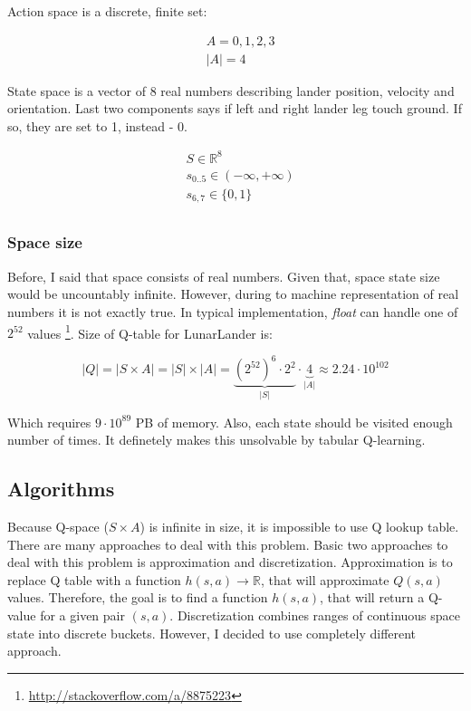\documentclass[12pt]{article}
\begin{document}
Action space is a discrete, finite set:

\begin{equation}
\begin{aligned}
&A = {0,1,2,3} \\
&|A| = 4
\end{aligned}
\end{equation}

State space is a vector of 8 real numbers describing lander position, velocity and orientation. Last two components says if left and right lander leg touch ground. If so, they are set to 1, instead - 0.

\begin{equation}
\begin{aligned}
&S \in \mathbb{R}^8 \\
&s_{0..5} \in (-\infty, +\infty) \\
&s_{6,7} \in \{0,1\} \\
\end{aligned}
\end{equation}

\subsubsection{Space size}

Before, I said that space consists of real numbers. Given that, space state size  would be uncountably infinite. However, during to machine representation of real numbers it is not exactly true. In typical implementation, \emph{float} can handle one of $2^{52}$ values \footnote{\url{http://stackoverflow.com/a/8875223}}. Size of Q-table for LunarLander is:

\begin{equation}
|Q| = |S \times A| = |S| \times |A| = \underbrace{{(2^{52})}^6 \cdot 2^2}_{|S|} \cdot \underbrace{4}_{|A|} \approx 2.24 \cdot 10^{102}
\end{equation}

Which requires $9 \cdot 10^{89}$ PB of memory. Also, each state should be visited enough number of times. It definetely makes this unsolvable by tabular Q-learning.

\subsection{Algorithms}

Because Q-space ($S \times A$) is infinite in size, it is impossible to use Q lookup table. There are many approaches to deal with this problem. Basic two approaches to deal with this problem is approximation and discretization. Approximation is to replace Q table with a function $h(s,a) \rightarrow \mathbb{R}$, that will approximate $Q(s, a)$ values. Therefore, the goal is to find a function $h(s, a)$, that will return a Q-value for a given pair $(s,a)$. 
Discretization combines ranges of continuous space state into discrete buckets. However, I decided to use completely different approach.
\end{document}
